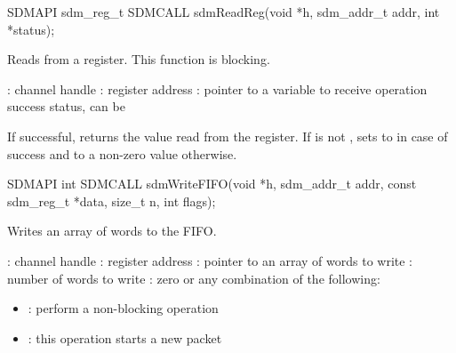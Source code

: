 \documentclass[a4paper,12pt,twoside,extrafontsizes]{memoir}
\begin{document}


\begin{cfuncprototype}
SDMAPI sdm_reg_t SDMCALL sdmReadReg(void *h, sdm_addr_t addr, int *status);
\end{cfuncprototype}

\begin{funcdescr}
	Reads from a register. This function is blocking.
\end{funcdescr}

\begin{funcparams}
	: channel handle
	: register address
	: pointer to a variable to receive operation success status, can be 
\end{funcparams}

\begin{funcret}
	If successful, returns the value read from the register. If  is not , sets  to  in case of success and to a non-zero value otherwise.
\end{funcret}



\begin{cfuncprototype}
SDMAPI int SDMCALL sdmWriteFIFO(void *h, sdm_addr_t addr, const sdm_reg_t *data, size_t n, int flags);
\end{cfuncprototype}

\begin{funcdescr}
	Writes an array of words to the FIFO.
\end{funcdescr}

\begin{funcparams}
	: channel handle
	: register address
	: pointer to an array of words to write
	: number of words to write
	: zero or any combination of the following:
		\begin{itemize}
			\item{}: perform a non-blocking operation
			\item{}: this operation starts a new packet
		\end{itemize}
\end{funcparams}
\end{document}
